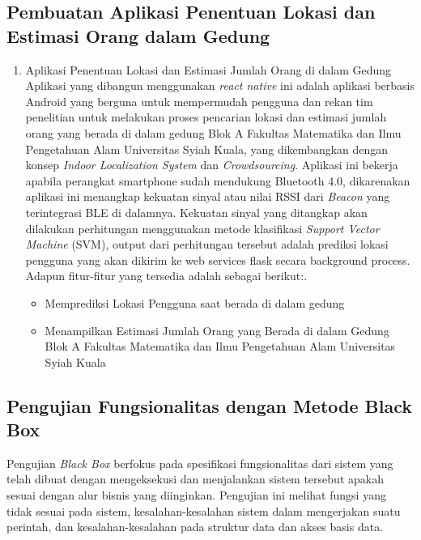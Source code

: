 \subsection{Pembuatan Aplikasi Penentuan Lokasi dan Estimasi Orang dalam Gedung}
\begin{enumerate}


	\item Aplikasi Penentuan Lokasi dan Estimasi Jumlah Orang di dalam Gedung
	      \newline
	      Aplikasi yang dibangun menggunakan \textit{react native} ini adalah aplikasi berbasis Android yang berguna untuk mempermudah pengguna dan rekan tim penelitian untuk melakukan proses
	      pencarian lokasi dan estimasi jumlah orang yang berada di dalam gedung Blok A Fakultas Matematika dan Ilmu Pengetahuan Alam Universitas Syiah Kuala, yang dikembangkan dengan konsep \textit{Indoor Localization System} dan \textit{Crowdsourcing}. Aplikasi ini bekerja apabila perangkat smartphone sudah mendukung Bluetooth 4.0, dikarenakan aplikasi ini menangkap kekuatan sinyal atau nilai RSSI dari \textit{Beacon} yang terintegrasi BLE di dalamnya. Kekuatan sinyal yang ditangkap akan dilakukan perhitungan menggunakan metode klasifikasi \textit{Support Vector Machine} (SVM), output dari perhitungan tersebut adalah prediksi lokasi pengguna yang akan dikirim ke web services flask secara background process. Adapun fitur-fitur yang tersedia adalah sebagai berikut:.

	      \begin {itemize}
	      \itemsep0em
	\item Memprediksi Lokasi Pengguna saat berada di dalam gedung\newline

	\item Menampilkan Estimasi Jumlah Orang yang Berada di dalam Gedung Blok A Fakultas Matematika dan Ilmu Pengetahuan Alam Universitas Syiah Kuala

	      \end{itemize}
\end{enumerate}
\subsection{Pengujian Fungsionalitas dengan Metode Black Box}
\par Pengujian \textit{Black Box} berfokus pada spesifikasi fungsionalitas dari sistem yang telah dibuat dengan mengeksekusi dan menjalankan sistem tersebut apakah sesuai dengan alur bisnis yang diinginkan. Pengujian ini melihat fungsi yang tidak sesuai pada sistem, kesalahan-kesalahan sistem dalam mengerjakan suatu perintah, dan kesalahan-kesalahan pada struktur data dan akses basis data.

